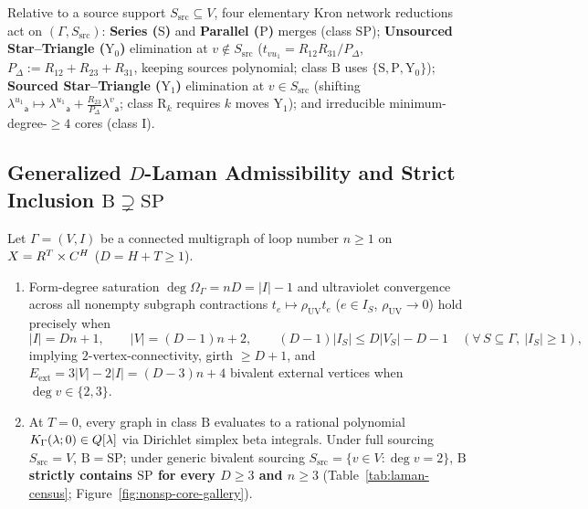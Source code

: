 Relative to a source support $S_{\mathrm{src}} \subseteq V$, four elementary Kron network reductions act on $(\Gamma, S_{\mathrm{src}})$: \textbf{Series ($\mathrm{S}$)} and \textbf{Parallel ($\mathrm{P}$)} merges (class $\mathrm{SP}$); \textbf{Unsourced Star--Triangle ($\mathrm{Y}_0$)} elimination at $v \notin S_{\mathrm{src}}$ ($t_{vu_1} = R_{12}R_{31}/P_\Delta$, $P_\Delta := R_{12}+R_{23}+R_{31}$, keeping sources polynomial; class $\mathrm{B}$ uses $\{\mathrm{S},\mathrm{P},\mathrm{Y}_0\}$); \textbf{Sourced Star--Triangle ($\mathrm{Y}_1$)} elimination at $v \in S_{\mathrm{src}}$ (shifting $\lambda^{u_1}{}_{\mathsf{a}} \mapsto \lambda^{u_1}{}_{\mathsf{a}} + \frac{R_{23}}{P_\Delta}\lambda^v{}_{\mathsf{a}}$; class $\mathrm{R}_k$ requires $k$ moves $\mathrm{Y}_1$); and irreducible minimum-degree-$\ge 4$ cores (class $\mathrm{I}$).

\subsection{Generalized \texorpdfstring{$D$}{D}-Laman Admissibility and Strict Inclusion \texorpdfstring{$\mathrm{B}\supsetneq\mathrm{SP}$}{B > SP}}
\label{subsec:d-laman}

\begin{theorem}
\label{thm:d-laman}
Let $\Gamma = (V,I)$ be a connected multigraph of loop number $n \ge 1$ on $X = R^T\times C^H$ ($D = H+T \ge 1$).
\begin{enumerate}[label=(\arabic*),leftmargin=*]
  \item Form-degree saturation $\deg\Omega_\Gamma = nD = |I|-1$ and ultraviolet convergence across all nonempty subgraph contractions $t_e \mapsto \rho_{\mathrm{UV}}t_e$ ($e \in I_S$, $\rho_{\mathrm{UV}} \to 0$) hold precisely when
  \begin{equation}
  \label{eq:d-laman-inequalities}
  |I| = Dn + 1,\qquad
  |V| = (D-1)n + 2,\qquad
  (D-1)|I_S| \le D|V_S| - D - 1\quad (\forall\,S \subseteq \Gamma,\ |I_S| \ge 1),
  \end{equation}
  implying $2$-vertex-connectivity, girth $\ge D+1$, and $E_{\mathrm{ext}} = 3|V|-2|I| = (D-3)n + 4$ bivalent external vertices when $\deg v \in \{2,3\}$.

  \item At $T = 0$, every graph in class $\mathrm{B}$ evaluates to a rational polynomial $K_\Gamma(\lambda;0) \in Q[\lambda]$ via Dirichlet simplex beta integrals. Under full sourcing $S_{\mathrm{src}} = V$, $\mathrm{B} = \mathrm{SP}$; under generic bivalent sourcing $S_{\mathrm{src}} = \{v \in V : \deg v = 2\}$, \textbf{$\mathrm{B}$ strictly contains $\mathrm{SP}$ for every $D \ge 3$ and $n \ge 3$} (Table~\ref{tab:laman-census}; Figure~\ref{fig:nonsp-core-gallery}).
\end{enumerate}
\end{theorem}

